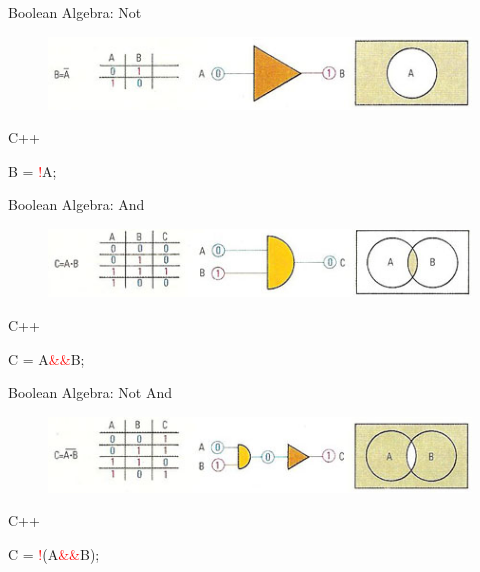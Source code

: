 \documentclass[xcolor={dvipsnames}]{beamer}
\begin{document}
\begin{frame}{Boolean Algebra: Not}
	\begin{figure}
		\href{http://www.daviddarling.info/encyclopedia/B/Boolean_algebra.html}{\includegraphics[width=1\textwidth]{not}}
	\end{figure}
	\pause
	\begin{block}{C++}
		\begin{center}
			{\LARGE B = \textcolor{red}{!}A;}
		\end{center}
	\end{block}
\end{frame}

\begin{frame}{Boolean Algebra: And}
	\begin{figure}
		\href{http://www.daviddarling.info/encyclopedia/B/Boolean_algebra.html}{\includegraphics[width=1\textwidth]{and}}
	\end{figure}
	\pause
	\begin{block}{C++}
		\begin{center}
			{\LARGE C = A\textcolor{red}{\&\&}B;}
		\end{center}
	\end{block}
\end{frame}

\begin{frame}{Boolean Algebra: Not And}
\begin{figure}
		\href{http://www.daviddarling.info/encyclopedia/B/Boolean_algebra.html}{\includegraphics[width=1\textwidth]{not_and}}
	\end{figure}
	\pause
	\begin{block}{C++}
		\begin{center}
			{\LARGE C = \textcolor{red}{!}(A\textcolor{red}{\&\&}B); }
		\end{center}
	\end{block}

\end{frame}
\end{document}
